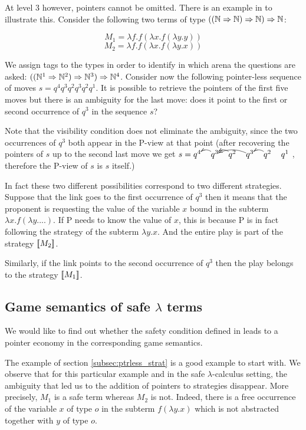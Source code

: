 At level 3 however, pointers cannot be omitted. There is an example
in \cite{abramsky:game-semantics} to illustrate this. Consider the
following two terms of type $((\mathbb{N} \Rightarrow \mathbb{N}) \Rightarrow \mathbb{N}) \Rightarrow
\mathbb{N}$:

$$M_1 = \lambda f . f (\lambda x . f (\lambda y .y ))$$
$$M_2 = \lambda f . f (\lambda x . f (\lambda y .x ))$$

We assign tags to the types in order to identify in which arena the
questions are asked: $((\mathbb{N}^1 \Rightarrow \mathbb{N}^2) \Rightarrow \mathbb{N}^3) \Rightarrow
\mathbb{N}^4$. Consider now the following pointer-less sequence of moves
$s = q^4 q^3 q^2 q^3 q^2 q^1$. It is possible to retrieve the
pointers of the first five moves but there is an ambiguity for the
last move: does it point to the first or second occurrence of $q^3$
in the sequence $s$?

Note that the visibility condition does not eliminate the ambiguity,
since the two occurrences of $q^3$ both appear in the P-view at that
point (after recovering the pointers of $s$ up to the second last
move we get $s = \xymatrix @=12pt@M=0pt{ q^4 & q^3 \ar@/_/[l] & q^2
\ar@/_/[l] & q^3 \ar@/_/[ll] & q^2 \ar@/_/[l] & q^1 }$ , therefore
the P-view of $s$ is $s$ itself.)


In fact these two different possibilities correspond to two
different strategies. Suppose that the link goes to the first
occurrence of $q^3$ then it means that the proponent is requesting
the value of the variable $x$ bound in the subterm $\lambda x . f (
\lambda y. ... )$. If P needs to know the value of $x$, this is
because P is in fact following the strategy of the subterm $\lambda
y . x$. And the entire play is part of the strategy ${[\![ M_2 ]\!]}$.

Similarly, if the link points to the second occurrence of $q^3$ then
the play belongs to the strategy ${[\![ M_1 ]\!]}$.

\subsection{Game semantics of safe $\lambda$ terms}

We would like to find out whether the safety condition defined in
\cite{Ong2005} leads to a pointer economy in the corresponding game
semantics.

The example of section \ref{subsec:ptrless_strat} is a good example
to start with. We observe that for this particular example and in
the safe $\lambda$-calculus setting, the ambiguity that led us to
the addition of pointers to strategies disappear. More precisely,
$M_1$ is a safe term whereas $M_2$ is not. Indeed, there is a free
occurrence of the variable $x$ of type $o$ in the subterm $f
(\lambda y . x)$ which is not abstracted together with $y$ of type
$o$.


